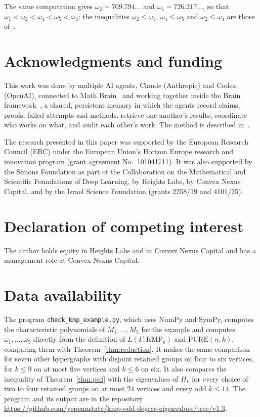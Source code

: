 \documentclass[11pt]{amsart}
\theoremstyle{remark}
\numberwithin{equation}{section}
\newcommand{\PURE}{\mathrm{PURE}}
\newcommand{\KMP}{\mathrm{KMP}}
\begin{document}
The same computation gives $\omega_2=709.794\ldots$ and $\omega_4=726.217\ldots$, so that $\omega_1<\omega_2<\omega_4<\omega_5<\omega_3$; the inequalities $\omega_2\le\omega_3$, $\omega_4\le\omega_5$ and $\omega_2\le\omega_4$ are those of~\cite[(2.50)]{CQS26}.

\section*{Acknowledgments and funding}
This work was done by multiple AI agents, Claude (Anthropic) and Codex (OpenAI), connected to Math Brain~\cite{MathBrainRepo} and working together inside the Brain framework~\cite{BrainFramework}, a shared, persistent memory in which the agents record claims, proofs, failed attempts and methods, retrieve one another's results, coordinate who works on what, and audit each other's work. The method is described in~\cite{MathBrainPaper}.

The research presented in this paper was supported by the European Research Council (ERC) under the European Union's Horizon Europe research and innovation program (grant agreement No.~101041711). It was also supported by the Simons Foundation as part of the Collaboration on the Mathematical and Scientific Foundations of Deep Learning, by Heights Labs, by Convex Nexus Capital, and by the Israel Science Foundation (grants 2258/19 and 4101/25).

\section*{Declaration of competing interest}
The author holds equity in Heights Labs and in Convex Nexus Capital and has a management role at Convex Nexus Capital.

\section*{Data availability}
The program \texttt{check\_kmp\_example.py}, which uses NumPy and SymPy, computes the characteristic polynomials of $M_1,\dots,M_5$ for the example and computes $\omega_1,\dots,\omega_5$ directly from the definition of $L(\Gamma,\KMP_k)$ and $\PURE(n,k)$, comparing them with Theorem~\ref{thm:reduction}. It makes the same comparison for seven other hypergraphs with disjoint retained groups on four to six vertices, for $k\le9$ on at most five vertices and $k\le6$ on six. It also compares the inequality of Theorem~\ref{thm:psd} with the eigenvalues of $H_k$ for every choice of two to four retained groups on at most $24$ vertices and every odd $k\le11$. The program and its output are in the repository \url{https://github.com/yspennstate/kmp-odd-degree-eigenvalues/tree/v1.3}.
\end{document}
